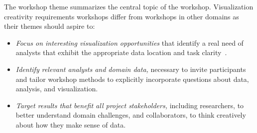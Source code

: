\begin{tcolorbox}[floatplacement=t,float,title=Defining a {\it Visualization} Workshop Theme]
The workshop theme summarizes the central topic of the workshop. Visualization creativity requirements workshops differ from workshops in other domains as their themes should aspire to:
\begin{itemize}[noitemsep,nolistsep]
\item {\it Focus on interesting visualization opportunities} that identify a real need of analysts that exhibit the appropriate data location and task clarity~\cite{Sedlmair2012}.
\item {\it Identify relevant analysts and domain data,} necessary to invite participants and tailor workshop methods to explicitly incorporate questions about data, analysis, and visualization.
\item {\it Target results that benefit all project stakeholders,} including researchers, to better understand domain challenges, and collaborators, to think creatively about how they make sense of data.
\end{itemize}
\end{tcolorbox}